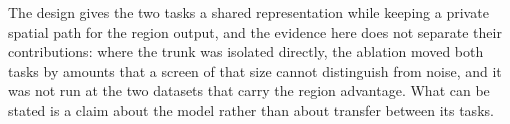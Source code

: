 The design gives the two tasks a shared representation while keeping a private spatial path for the
region output, and the evidence here does not separate their contributions: where the trunk was
isolated directly, the ablation moved both tasks by amounts that a screen of that size cannot
distinguish from noise, and it was not run at the two datasets that carry the region advantage.
What can be stated is a claim about the model rather than about transfer between its tasks.


